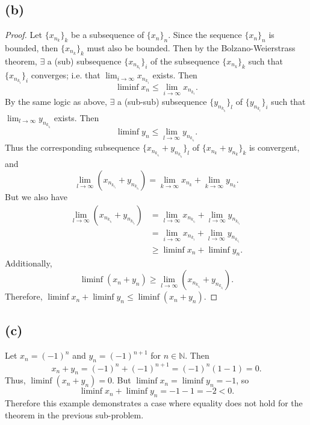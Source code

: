 \documentclass{article}
\begin{document}
\subsection*{(b)}
\begin{proof}
	Let $\{x_{n_k}\}_k$ be a subsequence of $\{x_n\}_n$. Since the sequence $\{x_n\}_n$ is bounded, then $\{x_{n_k}\}_k$ must also be bounded. Then by the Bolzano-Weierstrass theorem, $\exists$ a (sub) subsequence $\{x_{n_{k_i}}\}_i$ of the subsequence $\{x_{n_k}\}_k$ such that $\{x_{n_{k_i}}\}_i$ converges; i.e. that $\lim_{i\to\infty} x_{n_{k_i}}$ exists. Then
	\begin{equation}
		\liminf x_n \leq \lim_{i\to\infty} x_{n_{k_i}}.
	\end{equation}
	By the same logic as above, $\exists$ a (sub-sub) subsequence $\{y_{n_{k_{i_l}}}\}_l$ of $\{y_{n_{k_i}}\}_i$ such that $\lim_{l\to\infty} y_{n_{k_{i_l}}}$ exists. Then
	\begin{equation}
		\liminf y_n \leq \lim_{l \to \infty} y_{n_{k_{i_l}}}.
	\end{equation}
	Thus the corresponding subsequence $\{x_{n_{k_{i_l}}} + y_{n_{k_{i_l}}}\}_l$ of $\{x_{n_k} + y_{n_k}\}_k$ is convergent, and 
	\begin{equation}
		\lim_{l\to\infty}\left(x_{n_{k_{i_l}}} + y_{n_{k_{i_l}}}\right) = \lim_{k\to\infty} x_{n_k} + \lim_{k\to\infty} y_{n_k}.
	\end{equation}
	But we also have
	\begin{align}
		\lim_{l\to\infty}\left(x_{n_{k_{i_l}}} + y_{n_{k_{i_l}}}\right) &= \lim_{l\to\infty} x_{n_{k_{i_l}}} + \lim_{l\to\infty} y_{n_{k_{i_l}}}\\
		&= \lim_{i \to \infty} x_{n_{k_i}} + \lim_{l\to\infty} y_{n_{k_{i_l}}} \\
		& \geq \liminf x_n + \liminf y_n.
	\end{align}
	Additionally,
	\begin{equation}
		\liminf (x_n + y_n) \geq \lim_{l\to\infty}\left(x_{n_{k_{i_l}}} + y_{n_{k_{i_l}}}\right).
	\end{equation}
	Therefore, $\liminf x_n + \liminf y_n \leq \liminf (x_n + y_n)$. 
\end{proof}

\subsection*{(c)}
Let $x_n = (-1)^n$ and $y_n = (-1)^{n+1}$ for $n \in \mathbb{N}$. Then
\begin{equation}
	x_n + y_n = (-1)^n + (-1)^{n+1} = (-1)^n (1-1) = 0.
\end{equation}
Thus, $\liminf (x_n + y_n) = 0$. But $\liminf x_n = \liminf y_n = -1$, so 
\begin{equation}
	\liminf x_n + \liminf y_n = -1 - 1 = -2 < 0.
\end{equation}
Therefore this example demonstrates a case where equality does not hold for the theorem in the previous sub-problem. 
\end{document}
